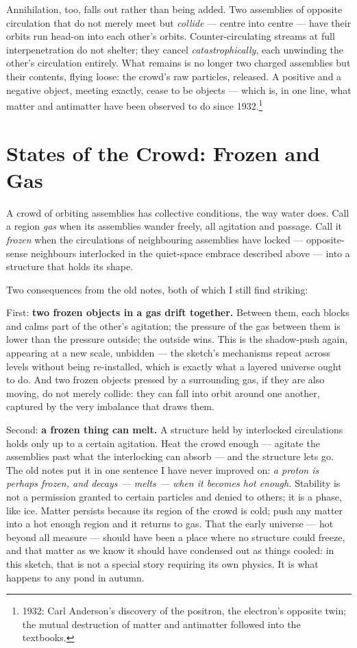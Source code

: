 \documentclass[fontsize=11pt,paper=a4,pagesize=auto,parskip=half-]{scrbook}
\begin{document}
Annihilation, too, falls out rather than being added. Two assemblies of opposite circulation that do not merely meet but \emph{collide} --- centre into centre --- have their orbits run head-on into each other's orbits. Counter-circulating streams at full interpenetration do not shelter; they cancel \emph{catastrophically}, each unwinding the other's circulation entirely. What remains is no longer two charged assemblies but their contents, flying loose: the crowd's raw particles, released. A positive and a negative object, meeting exactly, cease to be objects --- which is, in one line, what matter and antimatter have been observed to do since 1932.\footnote{1932: Carl Anderson's discovery of the positron, the electron's opposite twin; the mutual destruction of matter and antimatter followed into the textbooks.}

\section{States of the Crowd: Frozen and Gas}

A crowd of orbiting assemblies has collective conditions, the way water does. Call a region \emph{gas} when its assemblies wander freely, all agitation and passage. Call it \emph{frozen} when the circulations of neighbouring assemblies have locked --- opposite-sense neighbours interlocked in the quiet-space embrace described above --- into a structure that holds its shape.

Two consequences from the old notes, both of which I still find striking:

First: \textbf{two frozen objects in a gas drift together.} Between them, each blocks and calms part of the other's agitation; the pressure of the gas between them is lower than the pressure outside; the outside wins. This is the shadow-push again, appearing at a new scale, unbidden --- the sketch's mechanisms repeat across levels without being re-installed, which is exactly what a layered universe ought to do. And two frozen objects pressed by a surrounding gas, if they are also moving, do not merely collide: they can fall into orbit around one another, captured by the very imbalance that draws them.

Second: \textbf{a frozen thing can melt.} A structure held by interlocked circulations holds only up to a certain agitation. Heat the crowd enough --- agitate the assemblies past what the interlocking can absorb --- and the structure lets go. The old notes put it in one sentence I have never improved on: \emph{a proton is perhaps frozen, and decays --- melts --- when it becomes hot enough.} Stability is not a permission granted to certain particles and denied to others; it is a phase, like ice. Matter persists because its region of the crowd is cold; push any matter into a hot enough region and it returns to gas. That the early universe --- hot beyond all measure --- should have been a place where no structure could freeze, and that matter as we know it should have condensed out as things cooled: in this sketch, that is not a special story requiring its own physics. It is what happens to any pond in autumn.
\end{document}

